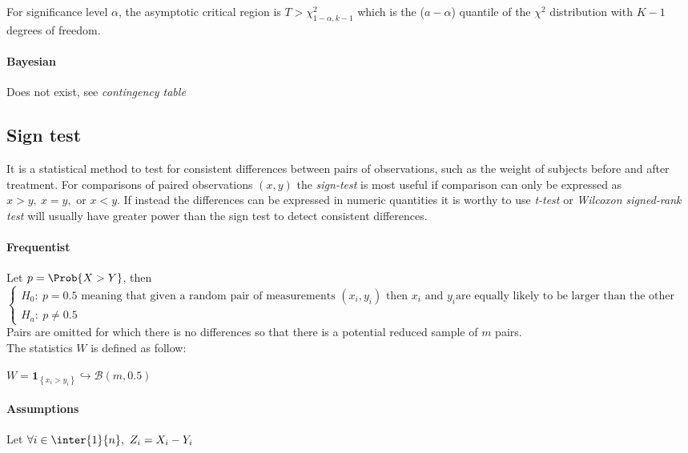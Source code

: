 For significance level $\alpha$, the asymptotic critical region is 
$T > \chi^{2}_{1-\alpha, k-1}$ which is the ($a-\alpha$) quantile of the $\chi^{2}$ 
distribution with $K-1$ degrees of freedom.

\paragraph{Bayesian}
Does not exist, see \emph{contingency table} \\



\subsection{Sign test}
It is a statistical method to test for consistent differences between pairs of 
observations, such as the weight of subjects before and after treatment.
For comparisons of paired observations $(x, y)$ the \emph{sign-test} is most useful if 
comparison can only be expressed as $x>y,~x=y,\text{ or } x<y$.
If instead the differences can be expressed in numeric quantities it is worthy to use 
\emph{t-test} or \emph{Wilcoxon signed-rank test} will usually have greater power than
the sign test to detect consistent differences.

\paragraph{Frequentist}
Let $p=\Prob{X>Y}$, then
$\begin{cases}
    H_{0}:~p=0.5\text{ meaning that given a random pair of measurements }(x_{i}, y_{i})
    \text{ then }x_{i}\text{ and }y_{i}\text{are equally likely to be larger than the
    other}\\
    H_{a}:~p\neq 0.5
\end{cases}$
Pairs are omitted for which there is no differences so that there is a potential reduced
sample of $m$ pairs.\\
The statistics $W$ is defined as follow:
\begin{center}
    $W = \mathbf{1}_{\left\{x_{i} > y_{i}\right\}} \hookrightarrow \mathcal{B}(m, 0.5)$
\end{center}

\paragraph{Assumptions}
Let $\forall i\in\inter{1}{n},~Z_{i} = X_{i} - Y_{i}$

